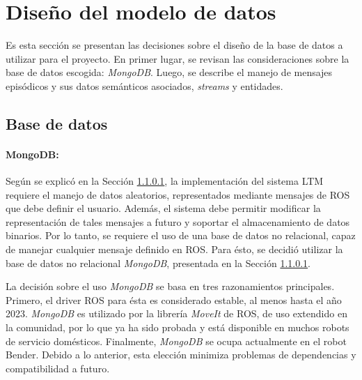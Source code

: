 \section{Diseño del modelo de datos}

Es esta sección se presentan las decisiones sobre el diseño de la base de datos a utilizar para el proyecto. En primer lugar, se revisan las consideraciones sobre la base de datos escogida: \textit{MongoDB}. Luego, se describe el manejo de mensajes episódicos y sus datos semánticos asociados, \textit{streams} y entidades.


\subsection{Base de datos}

\paragraph{MongoDB:}
Según se explicó en la Sección \ref{}, la implementación del sistema LTM requiere el manejo de datos aleatorios, representados mediante mensajes de ROS que debe definir el usuario. Además, el sistema debe permitir modificar la representación de tales mensajes a futuro y soportar el almacenamiento de datos binarios. Por lo tanto, se requiere el uso de una base de datos no relacional, capaz de manejar cualquier mensaje definido en ROS. Para ésto, se decidió utilizar la base de datos no relacional \textit{MongoDB}, presentada en la Sección \ref{}. 

La decisión sobre el uso \textit{MongoDB} se basa en tres razonamientos principales. Primero, el driver ROS para ésta es considerado estable, al menos hasta el año 2023. \textit{MongoDB} es utilizado por la librería \textit{MoveIt} de ROS, de uso extendido en la comunidad, por lo que ya ha sido probada y está disponible en muchos robots de servicio domésticos. Finalmente, \textit{MongoDB} se ocupa actualmente en el robot Bender. Debido a lo anterior, esta elección minimiza problemas de dependencias y compatibilidad a futuro.



